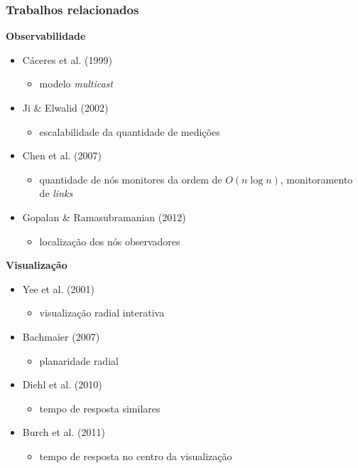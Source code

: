 \documentclass[10pt]{beamer}
\begin{document}
\begin{frame}
    \frametitle{Trabalhos relacionados}

\begin{minipage}{0.55\textwidth}
{\bf Observabilidade}\small
\begin{itemize}
\item Cáceres et al. (1999)
    \begin{itemize}
    \item modelo {\it multicast}
    \end{itemize}
\item Ji \& Elwalid (2002)
    \begin{itemize}
    \item escalabilidade da quantidade de medições
    \end{itemize}
\item Chen et al. (2007)
    \begin{itemize}
    \item quantidade de nós monitores da ordem de $O(n \log n)$,
        monitoramento de {\it links}
    \end{itemize}
\item Gopalan \& Ramasubramanian (2012)
    \begin{itemize}
    \item localização dos nós observadores
    \end{itemize}
\end{itemize}
\end{minipage}%
\begin{minipage}{0.45\textwidth}
{\bf Visualização}\small
\begin{itemize}
\item Yee et al. (2001)
    \begin{itemize}
    \item visualização radial interativa
    \end{itemize}
\item Bachmaier (2007)
    \begin{itemize}
    \item planaridade radial
    \end{itemize}
\item Diehl et al. (2010)
    \begin{itemize}
    \item tempo de resposta similares
    \end{itemize}
\item Burch et al. (2011)
    \begin{itemize}
    \item tempo de resposta no centro da visualização
    \end{itemize}
\end{itemize}
\end{minipage}

\end{frame}
\end{document}
